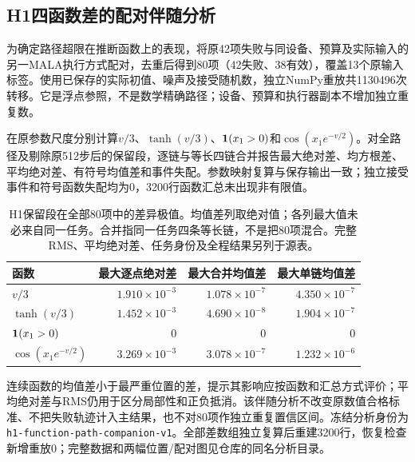 \subsection{H1四函数差的配对伴随分析}
为确定路径超限在推断函数上的表现，将原42项失败与同设备、预算及实际输入的另一MALA执行方式配对，去重后得到80项（42失败、38有效），覆盖13个原输入标签。使用已保存的实际初值、噪声及接受随机数，独立NumPy重放共1130496次转移。它是浮点参照，不是数学精确路径；设备、预算和执行器副本不增加独立重复数。

在原参数尺度分别计算$v/3$、$\tanh(v/3)$、$\mathbf{1}(x_1>0)$和$\cos(x_1e^{-v/2})$。对全路径及剔除原512步后的保留段，逐链与等长四链合并报告最大绝对差、均方根差、平均绝对差、有符号均值差和事件失配。参数映射复算与保存输出一致；独立接受事件和符号函数失配均为0，3200行函数汇总未出现非有限值。

\begin{table}[htbp]\centering\small
\begin{tabular}{lrrr}\toprule
函数 & 最大逐点绝对差 & 最大合并均值差 & 最大单链均值差\\\midrule
$v/3$ & $1.910\times10^{-3}$ & $1.078\times10^{-7}$ & $4.350\times10^{-7}$\\
$\tanh(v/3)$ & $1.452\times10^{-3}$ & $4.690\times10^{-8}$ & $1.904\times10^{-7}$\\
$\mathbf{1}(x_1>0)$ & $0$ & $0$ & $0$\\
$\cos(x_1e^{-v/2})$ & $3.269\times10^{-3}$ & $3.078\times10^{-7}$ & $1.232\times10^{-6}$\\
\bottomrule\end{tabular}
\caption{H1保留段在全部80项中的差异极值。均值差列取绝对值；各列最大值未必来自同一任务。合并指同一任务四条等长链，不是把80项混合。完整RMS、平均绝对差、任务身份及全程结果另列于源表。}
\label{tab:h1-function-companion}
\end{table}

连续函数的均值差小于最严重位置的差，提示其影响应按函数和汇总方式评价；平均绝对差与RMS仍用于区分局部性和正负抵消。该伴随分析不改变原数值合格标准、不把失败轨迹计入主结果，也不对80项作独立重复置信区间。冻结分析身份为\texttt{h1-function-path-companion-v1}。全部差数组独立复算后重建3200行，恢复检查新增重放0；完整数据和两幅位置/配对图见仓库的同名分析目录。

